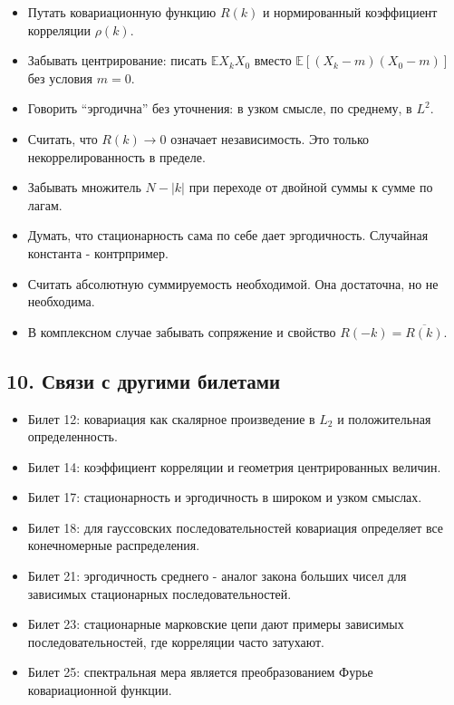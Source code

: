 \documentclass[
  11pt,
  a4paper,
]{article}
\providecommand{\tightlist}{%
  \setlength{\itemsep}{0pt}\setlength{\parskip}{0pt}}
\begin{document}
\begin{itemize}
\tightlist
\item
  Путать ковариационную функцию \(R(k)\) и нормированный коэффициент
  корреляции \(\rho(k)\).
\item
  Забывать центрирование: писать \(\mathbb EX_kX_0\) вместо
  \(\mathbb E[(X_k-m)(X_0-m)]\) без условия \(m=0\).
\item
  Говорить ``эргодична'' без уточнения: в узком смысле, по среднему, в
  \(L^2\).
\item
  Считать, что \(R(k)\to0\) означает независимость. Это только
  некоррелированность в пределе.
\item
  Забывать множитель \(N-|k|\) при переходе от двойной суммы к сумме по
  лагам.
\item
  Думать, что стационарность сама по себе дает эргодичность. Случайная
  константа - контрпример.
\item
  Считать абсолютную суммируемость необходимой. Она достаточна, но не
  необходима.
\item
  В комплексном случае забывать сопряжение и свойство
  \(R(-k)=\overline{R(k)}\).
\end{itemize}

\subsection{10. Связи с другими
билетами}\label{ux441ux432ux44fux437ux438-ux441-ux434ux440ux443ux433ux438ux43cux438-ux431ux438ux43bux435ux442ux430ux43cux438}

\begin{itemize}
\tightlist
\item
  Билет 12: ковариация как скалярное произведение в \(L_2\) и
  положительная определенность.
\item
  Билет 14: коэффициент корреляции и геометрия центрированных величин.
\item
  Билет 17: стационарность и эргодичность в широком и узком смыслах.
\item
  Билет 18: для гауссовских последовательностей ковариация определяет
  все конечномерные распределения.
\item
  Билет 21: эргодичность среднего - аналог закона больших чисел для
  зависимых стационарных последовательностей.
\item
  Билет 23: стационарные марковские цепи дают примеры зависимых
  последовательностей, где корреляции часто затухают.
\item
  Билет 25: спектральная мера является преобразованием Фурье
  ковариационной функции.
\end{itemize}
\end{document}
